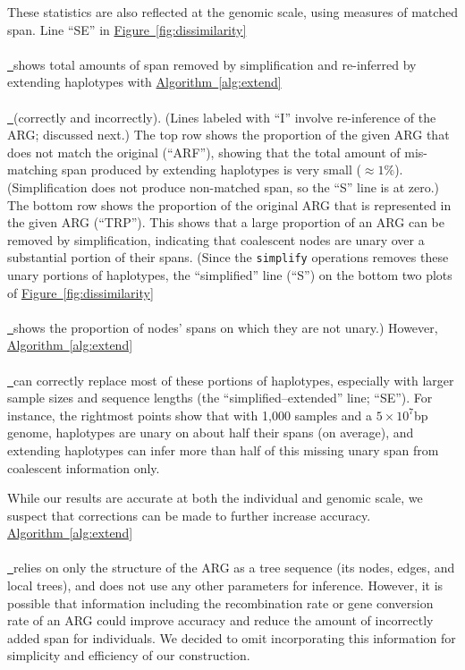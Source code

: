 \documentclass[10pt,twoside,lineno]{gsajnl}
\newcommand{\algorithmref}[2][]{%
	\hyperref[{#2}]{%
		Algorithm~\ref*{#2}%
		\ifx\\#1\\%
		\else
		\,#1%
		\fi
	}%
}
\newcommand*{\figref}[2][]{%
	\hyperref[{#2}]{%
		Figure~\ref*{#2}%
		\ifx\\#1\\%
		\else
		\,#1%
		\fi
	}%
}
\begin{document}
These statistics are also reflected at the genomic scale, using measures of matched span.
Line ``SE'' in \figref{fig:dissimilarity} shows total amounts of span removed by simplification
and re-inferred by extending haplotypes with \algorithmref{alg:extend} (correctly and incorrectly).
(Lines labeled with ``I'' involve re-inference of the ARG; discussed next.)
The top row shows the proportion of the given ARG that does not match the original (``ARF''),
showing that the total amount of mis-matching span
produced by extending haplotypes is very small ($\approx 1\%$).
(Simplification does not produce non-matched span, so the ``S'' line is at zero.)
The bottom row shows the proportion of the original ARG that is represented in the given ARG (``TRP'').
This shows that a large proportion of an ARG can be removed by simplification,
indicating that coalescent nodes are unary
over a substantial portion of their spans.
(Since the \texttt{simplify} operations removes these unary portions of haplotypes,
the ``simplified'' line (``S'') on the bottom two plots of \figref{fig:dissimilarity} shows
the proportion of nodes' spans on which they are not unary.)
However, \algorithmref{alg:extend} can correctly replace most of these portions of haplotypes,
especially with larger sample sizes and sequence lengths
(the ``simplified--extended'' line; ``SE'').
For instance, the rightmost points show that
with 1,000 samples and a $5 \times 10^7$bp genome,
haplotypes are unary on about half their spans (on average),
and extending haplotypes can infer more than half of this missing unary span from coalescent information only.

While our results are accurate at both the individual and genomic scale, 
we suspect that corrections can be made to further increase accuracy. 
\algorithmref{alg:extend} relies on only the structure of the ARG as a tree sequence (its nodes, edges, and local trees), 
and does not use any other parameters for inference.
However, it is possible that information including the recombination rate or gene conversion rate of an ARG could improve 
accuracy and reduce the amount of incorrectly added span for individuals.
We decided to omit incorporating this information for simplicity and efficiency of our construction.
\end{document}
